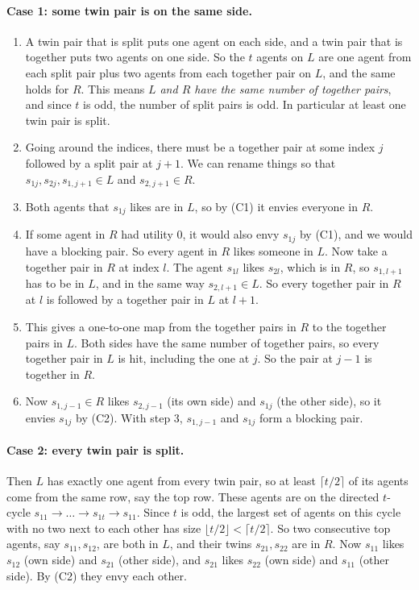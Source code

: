 \documentclass[11pt,a4paper]{article}
\theoremstyle{definition}
\theoremstyle{remark}
\theoremstyle{plain}
\begin{document}
\paragraph{Case 1: some twin pair is on the same side.}
\begin{enumerate}
  \item A twin pair that is split puts one agent on each side, and a twin pair that is together puts two agents on one side. So the $t$ agents on $L$ are one agent from each split pair plus two agents from each together pair on $L$, and the same holds for $R$. This means \emph{$L$ and $R$ have the same number of together pairs}, and since $t$ is odd, the number of split pairs is odd. In particular at least one twin pair is split.
  \item Going around the indices, there must be a together pair at some index $j$ followed by a split pair at $j+1$. We can rename things so that $s_{1j},s_{2j},s_{1,j+1}\in L$ and $s_{2,j+1}\in R$.
  \item Both agents that $s_{1j}$ likes are in $L$, so by (C1) it envies everyone in $R$.
  \item If some agent in $R$ had utility $0$, it would also envy $s_{1j}$ by (C1), and we would have a blocking pair. So every agent in $R$ likes someone in $L$. Now take a together pair in $R$ at index $l$. The agent $s_{1l}$ likes $s_{2l}$, which is in $R$, so $s_{1,l+1}$ has to be in $L$, and in the same way $s_{2,l+1}\in L$. So every together pair in $R$ at $l$ is followed by a together pair in $L$ at $l+1$.
  \item This gives a one-to-one map from the together pairs in $R$ to the together pairs in $L$. Both sides have the same number of together pairs, so every together pair in $L$ is hit, including the one at $j$. So the pair at $j-1$ is together in $R$.
  \item Now $s_{1,j-1}\in R$ likes $s_{2,j-1}$ (its own side) and $s_{1j}$ (the other side), so it envies $s_{1j}$ by (C2). With step 3, $s_{1,j-1}$ and $s_{1j}$ form a blocking pair.
\end{enumerate}

\paragraph{Case 2: every twin pair is split.} Then $L$ has exactly one agent from every twin pair, so at least $\lceil t/2\rceil$ of its agents come from the same row, say the top row. These agents are on the directed $t$-cycle $s_{11}\to\dots\to s_{1t}\to s_{11}$. Since $t$ is odd, the largest set of agents on this cycle with no two next to each other has size $\lfloor t/2\rfloor<\lceil t/2\rceil$. So two consecutive top agents, say $s_{11},s_{12}$, are both in $L$, and their twins $s_{21},s_{22}$ are in $R$. Now $s_{11}$ likes $s_{12}$ (own side) and $s_{21}$ (other side), and $s_{21}$ likes $s_{22}$ (own side) and $s_{11}$ (other side). By (C2) they envy each other.
\end{document}
